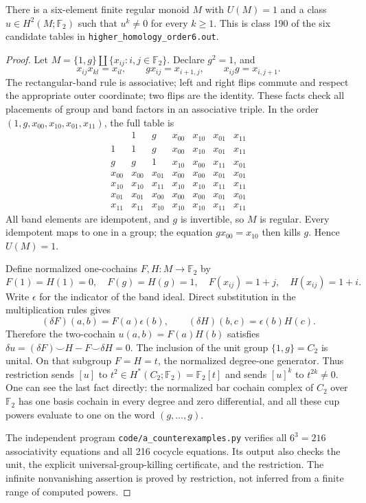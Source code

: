\begin{theorem}\label{A:six-nonnilpotent}
There is a six-element finite regular monoid $M$ with $U(M)=1$ and a class
$u\in H^2(M;\mathbb F_2)$ such that $u^k\ne0$ for every $k\geq1$.
This is class 190 of the six candidate tables in
\texttt{higher\_homology\_order6.out}.
\end{theorem}
\begin{proof}
Let $M=\{1,g\}\amalg\{x_{ij}:i,j\in\mathbb F_2\}$. Declare $g^2=1$, and
\[
 x_{ij}x_{kl}=x_{il},\qquad
 gx_{ij}=x_{i+1,j},\qquad x_{ij}g=x_{i,j+1}.
\]
The rectangular-band rule is associative; left and right flips commute and
respect the appropriate outer coordinate; two flips are the identity.
These facts check all placements of group and band factors in an associative
triple. In the order $(1,g,x_{00},x_{10},x_{01},x_{11})$, the full table is
\[
\begin{array}{c|rrrrrr}
 &1&g&x_{00}&x_{10}&x_{01}&x_{11}\\\hline
1&1&g&x_{00}&x_{10}&x_{01}&x_{11}\\
g&g&1&x_{10}&x_{00}&x_{11}&x_{01}\\
x_{00}&x_{00}&x_{01}&x_{00}&x_{00}&x_{01}&x_{01}\\
x_{10}&x_{10}&x_{11}&x_{10}&x_{10}&x_{11}&x_{11}\\
x_{01}&x_{01}&x_{00}&x_{00}&x_{00}&x_{01}&x_{01}\\
x_{11}&x_{11}&x_{10}&x_{10}&x_{10}&x_{11}&x_{11}
\end{array}
\]
All band elements are idempotent, and $g$ is invertible, so $M$ is regular.
Every idempotent maps to one in a group; the equation $gx_{00}=x_{10}$ then
kills $g$. Hence $U(M)=1$.

Define normalized one-cochains $F,H:M\to\mathbb F_2$ by
\[
 F(1)=H(1)=0,\quad F(g)=H(g)=1,\quad
 F(x_{ij})=1+j,\quad H(x_{ij})=1+i.
\]
Write $\epsilon$ for the indicator of the band ideal. Direct substitution in
the multiplication rules gives
\[
 (\delta F)(a,b)=F(a)\epsilon(b),\qquad
 (\delta H)(b,c)=\epsilon(b)H(c).
\]
Therefore the two-cochain $u(a,b)=F(a)H(b)$ satisfies
$\delta u=(\delta F)\smile H-F\smile\delta H=0$.
The inclusion of the unit group $\{1,g\}=C_2$ is unital. On that subgroup
$F=H=t$, the normalized degree-one generator. Thus restriction sends
$[u]$ to $t^2\in H^*(C_2;\mathbb F_2)=\mathbb F_2[t]$ and sends $[u]^k$ to
$t^{2k}\ne0$. One can see the last fact directly: the normalized bar
cochain complex of $C_2$ over $\mathbb F_2$ has one basis cochain in every
degree and zero differential, and all these cup powers evaluate to one
on the word $(g,\ldots,g)$.

The independent program \texttt{code/a\_counterexamples.py} verifies all
$6^3=216$ associativity equations and all 216 cocycle equations. Its output
also checks the unit, the explicit universal-group-killing certificate,
and the restriction. The infinite nonvanishing assertion is proved by
restriction, not inferred from a finite range of computed powers.
\end{proof}

